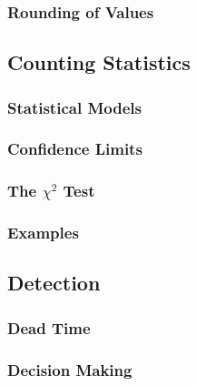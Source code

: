 \subsubsection{Rounding of Values}
\subsection{Counting Statistics}
\subsubsection{Statistical Models}
\subsubsection{Confidence Limits}
\subsubsection{The \texorpdfstring{$\chi^2$}{Chi-squared} Test}
\subsubsection{Examples}
\subsection{Detection}
\subsubsection{Dead Time}
\subsubsection{Decision Making}